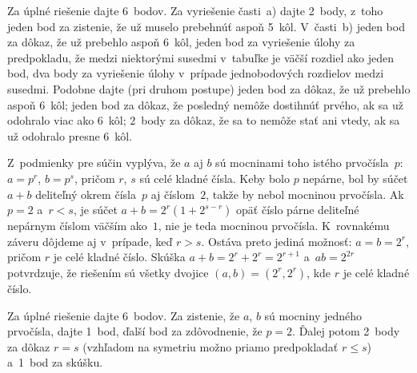 {\nobreak\medskip\petit\noindent
Za úplné riešenie dajte 6~bodov.
Za vyriešenie časti~a) dajte 2~body, z~toho jeden bod za zistenie, že už muselo prebehnúť aspoň 5~kôl. V~časti~b) jeden bod za dôkaz, že už prebehlo aspoň 6~kôl, jeden bod za vyriešenie úlohy za predpokladu, že medzi niektorými susedmi v~tabuľke je väčší rozdiel ako jeden bod, dva body za vyriešenie úlohy v~prípade jednobodových rozdielov medzi susedmi.
Podobne dajte (pri druhom postupe) jeden bod za dôkaz, že už prebehlo aspoň 6~kôl; jeden bod za dôkaz, že posledný nemôže dostihnúť prvého, ak sa už odohralo viac ako 6~kôl; 2~body za dôkaz, že sa to nemôže stať ani vtedy, ak sa už odohralo presne 6~kôl.
\endpetit
\bigbreak}

{%
Z~podmienky pre súčin vyplýva, že $a$ aj $b$ sú mocninami toho istého
prvočísla~$p$: $a = p^r$, $b=p^s$, pričom $r$, $s$ sú celé kladné čísla.
Keby bolo $p$ nepárne, bol by súčet $a+b$ deliteľný okrem čísla~$p$ aj číslom~$2$,
takže by nebol mocninou prvočísla. Ak $p=2$ a~$r<s$, je súčet $a+b=2^r(1+2^{s-r})$
opäť číslo párne deliteľné nepárnym číslom väčším ako~$1$,
nie je teda mocninou prvočísla. K~rovnakému záveru dôjdeme aj v~prípade,
keď $r>s$. Ostáva preto jediná možnosť: $a=b=2^r$, pričom $r$ je celé kladné číslo.
Skúška $a + b = 2^r + 2^r = 2^{r +1}$
a~$ab = 2^{2r}$ potvrdzuje, že riešením sú všetky dvojice $(a,b)=(2^r,2^r)$,
kde $r$ je celé kladné číslo.

\nobreak\medskip\petit\noindent
Za úplné riešenie dajte 6~bodov.
Za zistenie, že $a$, $b$ sú mocniny jedného prvočísla, dajte 1~bod, ďalší bod za
zdôvodnenie, že $p = 2$. Ďalej potom 2~body za dôkaz $r = s$
(vzhľadom na symetriu možno priamo predpokladať $r\le s$) a~1~bod za skúšku.

\endpetit
\bigbreak}

